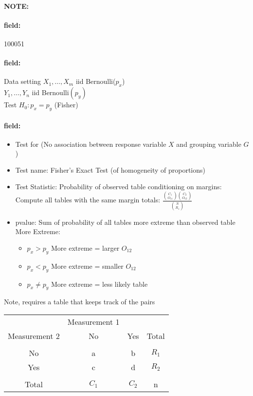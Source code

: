 \documentclass[12pt]{article}
\newenvironment{note}{\paragraph{NOTE:}}{}
\newenvironment{field}{\paragraph{field:}}{}
\begin{document}
\begin{note} \begin{field} \tiny 100051 \end{field}
 \begin{field}
  Data setting $X_1, \ldots , X_m$ iid Bernoulli($p_x$)\\
  $Y_1, \ldots, Y_n$ iid Bernoulli$(p_y)$\\
  Test $H_0: p_x = p_y $  (Fisher)
 \end{field}
 \begin{field}
  \begin{itemize}
   \item Test for (No association between response variable $X$ and grouping variable $G$)
   \item Test name: Fisher's Exact Test (of homogeneity of proportions)
   \item Test Statistic: Probability of observed table conditioning on margins: Compute all tables with the same margin totals: $\frac{\binom{C_1}{O_{11}}\binom{C_2}{O_{12}}}{\binom{N}{R_1}}$
   \item pvalue: Sum of probability of all tables more extreme than observed table
         More Extreme:
         \begin{itemize}
          \item $p_x > p_y$ More extreme = larger $O_{12}$
          \item $p_x < p_y$ More extreme = smaller $O_{12}$
          \item $p_x \neq p_y$ More extreme = less likely table
         \end{itemize}
  \end{itemize}
  Note, requires a table that keeps track of the pairs
        \begin{tabular}{|c|c c|c|}
                       & Measurement 1 &       &       \\
         Measurement 2 & No            & Yes   & Total \\
         \hline                                        \\
         No            & a             & b     & $R_1$ \\
         Yes           & c             & d     & $R_2$ \\
         \hline                                        \\
         Total         & $C_1$         & $C_2$ & n     \\
         \hline
        \end{tabular}
 \end{field}
\end{note}
\end{document}
